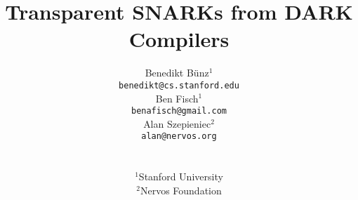 \documentclass[12pt]{article}
\theoremstyle{definition}
\theoremstyle{named}
\begin{document}
\title{Transparent SNARKs from DARK Compilers}
\author{\begin{tabular}{c}Benedikt B\"unz$^1$ \\ \small \texttt{benedikt@cs.stanford.edu} \end{tabular}   \begin{tabular}{c}Ben Fisch$^1$ \\ \small \texttt{benafisch@gmail.com} \end{tabular}   \begin{tabular}{c}Alan Szepieniec$^2$ \\ \small \texttt{alan@nervos.org} \end{tabular} \\
\\
$^1$Stanford University\\
$^2$Nervos Foundation}

\date{}


\maketitle
\end{document}
